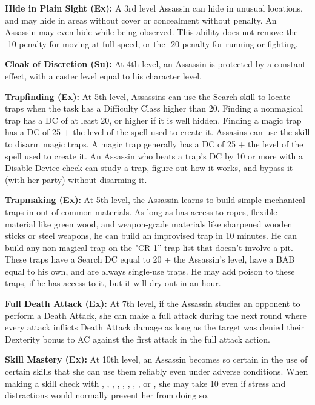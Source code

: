 \textbf{Hide in Plain Sight (Ex):} A 3rd level Assassin can hide in unusual locations, and may hide in areas without cover or concealment without penalty. An Assassin may even hide while being observed. This ability does not remove the -10 penalty for moving at full speed, or the -20 penalty for running or fighting.

\textbf{Cloak of Discretion (Su):} At 4th level, an Assassin is protected by a constant  effect, with a caster level equal to his character level.

\textbf{Trapfinding (Ex):} At 5th level, Assassins can use the Search skill to locate traps when the task has a Difficulty Class higher than 20. Finding a nonmagical trap has a DC of at least 20, or higher if it is well hidden. Finding a magic trap has a DC of 25 + the level of the spell used to create it. Assasins can use the  skill to disarm magic traps. A magic trap generally has a DC of 25 + the level of the spell used to create it. An Assassin who beats a trap's DC by 10 or more with a Disable Device check can study a trap, figure out how it works, and bypass it (with her party) without disarming it.

\textbf{Trapmaking (Ex):} At 5th level, the Assassin learns to build simple mechanical traps in out of common materials. As long as has access to ropes, flexible material like green wood, and weapon-grade materials like sharpened wooden sticks or steel weapons, he can build an improvised trap in 10 minutes. He can build any non-magical trap on the "CR 1'' trap list that doesn't involve a pit. These traps have a Search DC equal to 20 + the Assassin's level, have a BAB equal to his own, and are always single-use traps. He may add poison to these traps, if he has access to it, but it will dry out in an hour.

\textbf{Full Death Attack (Ex):} At 7th level, if the Assassin studies an opponent to perform a Death Attack, she can make a full attack during the next round where every attack inflicts Death Attack damage as long as the target was denied their Dexterity bonus to AC against the first attack in the full attack action.

\textbf{Skill Mastery (Ex):} At 10th level, an Assassin becomes so certain in the use of certain skills that she can use them reliably even under adverse conditions. When making a skill check with , , , , , , , , or , she may take 10 even if stress and distractions would normally prevent her from doing so.

